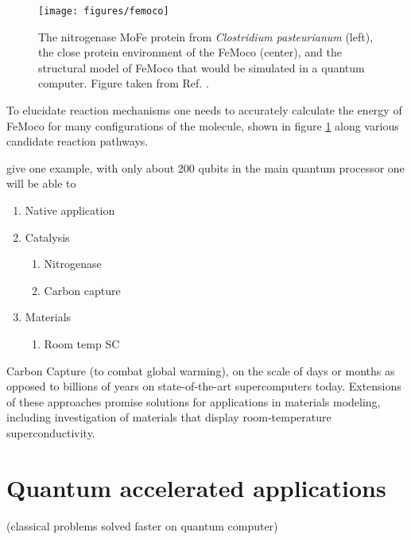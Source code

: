 \documentclass[journal]{IEEEtran}
\begin{document}
\begin{figure}[t]
\centering
\texttt{[image: figures/femoco]}
\caption{The nitrogenase MoFe protein from {\it Clostridium pasteurianum} (left), the close protein environment of the FeMoco (center), and the structural model of FeMoco that would be simulated in a quantum computer. Figure taken from Ref. \cite{nitrogenase}.}
\label{fig:femoco}
\end{figure}


To elucidate reaction mechanisms one needs to accurately calculate the energy of FeMoco for many configurations of the molecule, shown in figure \ref{fig:femoco} along various candidate reaction pathways. 

 give one example, with only about 200 qubits in the main quantum processor one will be able to 
 
 

\begin{enumerate}
\item      Native application
\item     Catalysis
\begin{enumerate}
                               \item         Nitrogenase
                           \item        Carbon capture
\end{enumerate}
\item      Materials
 \begin{enumerate}
                           \item         Room temp SC
\end{enumerate}
\end{enumerate}


 Carbon Capture (to combat global warming), on the scale of days or months as opposed to billions of years on state-of-the-art supercomputers today.  Extensions of these approaches promise solutions for applications in materials modeling, including investigation of materials that display room-temperature superconductivity. 




\section{Quantum accelerated applications}
 (classical problems solved faster on quantum computer)
\end{document}
